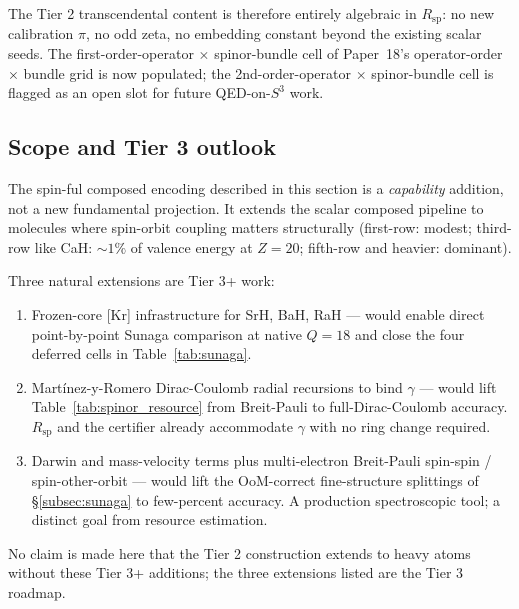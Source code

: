 \documentclass[aps,pra,twocolumn,superscriptaddress,longbibliography]{revtex4-2}
\begin{document}
The Tier 2 transcendental content is therefore entirely algebraic in
$R_{\mathrm{sp}}$: no new calibration $\pi$, no odd zeta, no
embedding constant beyond the existing scalar seeds. The
first-order-operator $\times$ spinor-bundle cell of Paper~18's
operator-order $\times$ bundle grid is now populated; the
2nd-order-operator $\times$ spinor-bundle cell is flagged as an open
slot for future QED-on-$S^3$ work.

\subsection{Scope and Tier 3 outlook}
\label{subsec:spinor_scope}

The spin-ful composed encoding described in this section is a
\emph{capability} addition, not a new fundamental projection. It
extends the scalar composed pipeline to molecules where spin-orbit
coupling matters structurally (first-row: modest; third-row like CaH:
$\sim 1\%$ of valence energy at $Z=20$; fifth-row and heavier:
dominant).

Three natural extensions are Tier 3+ work:
\begin{enumerate}
  \item Frozen-core [Kr] infrastructure for SrH, BaH, RaH — would
    enable direct point-by-point Sunaga comparison at native $Q = 18$
    and close the four deferred cells in Table~\ref{tab:sunaga}.
  \item Martínez-y-Romero Dirac-Coulomb radial recursions to bind
    $\gamma$ — would lift Table~\ref{tab:spinor_resource} from
    Breit-Pauli to full-Dirac-Coulomb accuracy. $R_{\mathrm{sp}}$ and
    the certifier already accommodate $\gamma$ with no ring change
    required.
  \item Darwin and mass-velocity terms plus multi-electron
    Breit-Pauli spin-spin / spin-other-orbit — would lift the
    OoM-correct fine-structure splittings of \S\ref{subsec:sunaga} to
    few-percent accuracy. A production spectroscopic tool; a distinct
    goal from resource estimation.
\end{enumerate}

No claim is made here that the Tier 2 construction extends to heavy
atoms without these Tier 3+ additions; the three extensions listed
are the Tier 3 roadmap.
\end{document}
